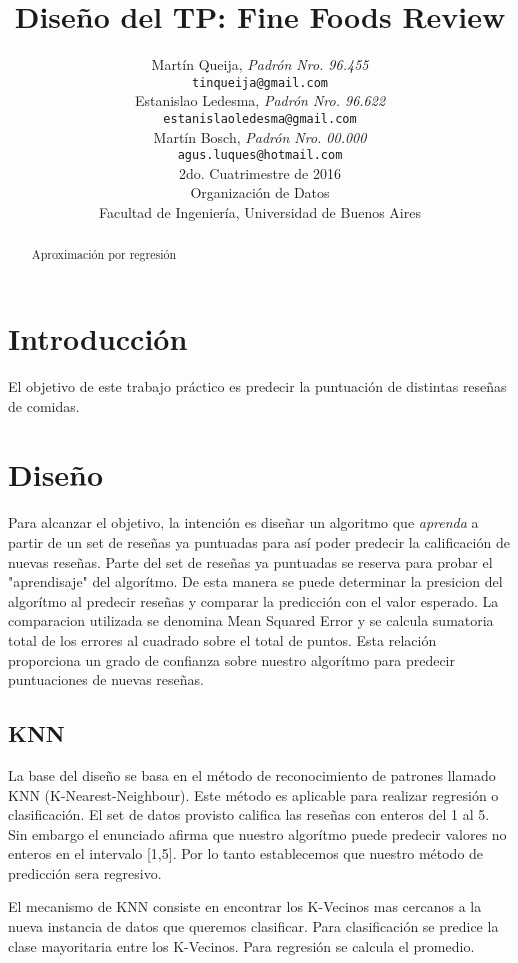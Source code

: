 \documentclass[a4paper,10pt]{article}
\title{		\textbf{Diseño del TP: Fine Foods Review}}
\author{	Martín Queija, \textit{Padrón Nro. 96.455}                     \\
	\texttt{ tinqueija@gmail.com }                                              \\[2.5ex]
	Estanislao Ledesma, \textit{Padrón Nro. 96.622}                     \\
	\texttt{ estanislaoledesma@gmail.com }                                              \\[2.5ex]
	Martín Bosch, \textit{Padrón Nro. 00.000}                     \\
	\texttt{ agus.luques@hotmail.com }                                              \\[2.5ex]
	\normalsize{2do. Cuatrimestre de 2016}                                      \\
	\normalsize{Organización de Datos  }  \\
	\normalsize{Facultad de Ingeniería, Universidad de Buenos Aires}            \\
}
\date{}
\begin{document}
	
	\maketitle
	\thispagestyle{empty}   %
	
	
	\begin{abstract}
		\centerline{Aproximación por regresión}
		
	\end{abstract}
	\newpage
	
	\tableofcontents
	
	
	\section{Introducción}
	
	El objetivo de este trabajo práctico es predecir la puntuación de distintas reseñas de comidas.
	
	\section{Diseño}
	
	Para alcanzar el objetivo, la intención es diseñar un algoritmo que \textit{aprenda} a partir de un set de reseñas ya puntuadas para así poder predecir la calificación de nuevas reseñas. Parte del set de reseñas ya puntuadas se reserva para probar el "aprendisaje" del algorítmo. De esta manera se puede determinar la presicion del algorítmo al predecir reseñas y comparar la predicción con el valor esperado. La comparacion utilizada se denomina Mean Squared Error y se calcula sumatoria total de los errores al cuadrado sobre el total de puntos. Esta relación proporciona un grado de confianza sobre nuestro algorítmo para predecir puntuaciones de nuevas reseñas.
	
	
	\subsection{KNN}
	La base del diseño se basa en el método de reconocimiento de patrones llamado KNN (K-Nearest-Neighbour). Este método es aplicable para realizar regresión o clasificación. El set de datos provisto califica las reseñas con enteros del 1 al 5. Sin embargo el enunciado afirma que nuestro algorítmo puede predecir valores no enteros en el intervalo [1,5]. Por lo tanto establecemos que nuestro método de predicción sera regresivo.
	
	El mecanismo de KNN consiste en encontrar los K-Vecinos mas cercanos a la nueva instancia de datos que queremos clasificar. Para clasificación se predice la clase mayoritaria entre los K-Vecinos. Para regresión se calcula el promedio.
	
\end{document}

